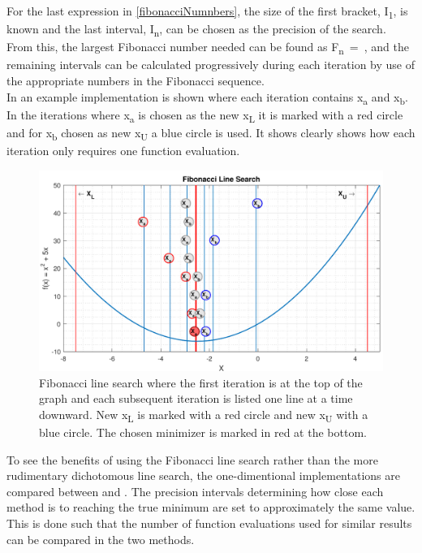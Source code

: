 For the last expression in \eqref{fibonacciNumnbers}, the size of the first bracket, \si{I_1}, is known and the last interval, \si{I_n}, can be chosen as the precision of the search. From this, the largest Fibonacci number needed can be found as \si{F_n = }, and the remaining intervals can be calculated progressively during each iteration by use of the appropriate numbers in the Fibonacci sequence.\\
In  an example implementation is shown where each iteration contains \si{x_a} and \si{x_b}. In the iterations where \si{x_a} is chosen as the new \si{x_{L}} it is marked with a red circle and for \si{x_b} chosen as new \si{x_{U}} a blue circle is used. It shows clearly shows how each iteration only requires one function evaluation.

\begin{figure}[H] 
	\centering
	\includegraphics[width=.8\textwidth]{figures/fibonacciLineSearchComprehension}
	\caption{Fibonacci line search where the first iteration is at the top of the graph and each subsequent iteration is listed one line at a time downward. New \si{x_{L}} is marked with a red circle and new \si{x_{U}} with a blue circle. The chosen minimizer is marked in red at the bottom.}
	\label{fibonacciLineSearchComprehensive}
\end{figure}

To see the benefits of using the Fibonacci line search rather than the more rudimentary dichotomous line search, the one-dimentional implementations are compared between  and . The precision intervals determining how close each method is to reaching the true minimum are set to approximately the same value. This is done such that the number of function evaluations used for similar results can be compared in the two methods.

